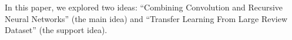In this paper, we explored two ideas: ``Combining Convolution and Recursive Neural Networks'' (the main idea) and ``Transfer Learning From Large Review Dataset'' (the support idea).
